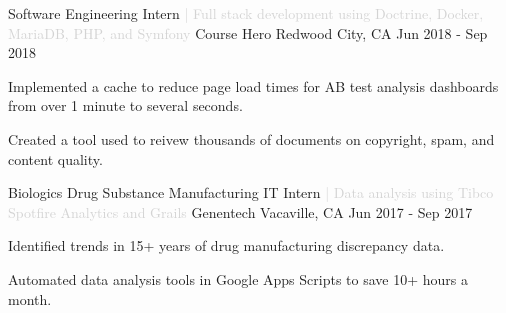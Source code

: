 

\begin{cventries}

  \cventry
  {Software Engineering Intern \textcolor{lightgray}{| Full stack development using Doctrine, Docker, MariaDB, PHP, and Symfony}}
  {Course Hero}
  {Redwood City, CA}
  {Jun 2018 - Sep 2018}
  {
  \begin{cvitems}
    \item {Implemented a cache to reduce page load times for AB test analysis dashboards from over 1 minute to several seconds.}
    \item {Created a tool used to reivew thousands of documents on copyright, spam, and content quality.}
  \end{cvitems}
  }

  \cventry
  {Biologics Drug Substance Manufacturing IT Intern \textcolor{lightgray}{| Data analysis using Tibco Spotfire Analytics and Grails} } %
  {Genentech} %
  {Vacaville, CA} %
  {Jun 2017 - Sep 2017} %
  {
  \begin{cvitems} %
    \item {Identified trends in 15+ years of drug manufacturing discrepancy data.}
    \item {Automated data analysis tools in Google Apps Scripts to save 10+ hours a month.}
  \end{cvitems}
  }
\end{cventries}
